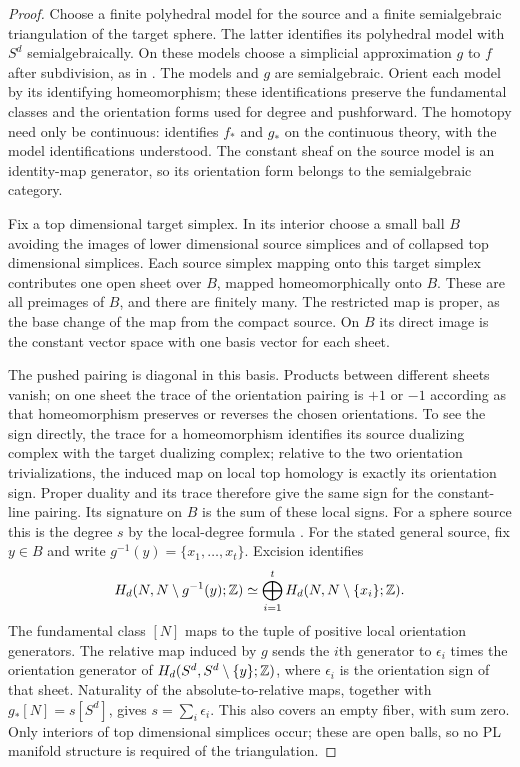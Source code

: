 \begin{proof}
Choose a finite polyhedral model for the source and a finite
semialgebraic triangulation of the target sphere.  The latter
identifies its polyhedral model with $S^d$ semialgebraically.
On these models choose a simplicial approximation $g$ to $f$
after subdivision, as in
\cite[Theorem~2C.1, pp.~177--179]{Hatcher2002}.
The models and $g$ are semialgebraic.  Orient each model by its
identifying homeomorphism; these identifications preserve the
fundamental classes and the orientation forms used for degree and
pushforward.  The homotopy need only be continuous:
 identifies $f_*$ and $g_*$ on the continuous
theory, with the model identifications understood.  The constant
sheaf on the source model is an identity-map generator, so its
orientation form belongs to the semialgebraic category.

Fix a top dimensional target simplex.  In its interior choose
a small ball $B$ avoiding the images of lower dimensional source
simplices and of collapsed top dimensional simplices.  Each
source simplex mapping onto this target simplex contributes
one open sheet over $B$, mapped homeomorphically onto $B$.
These are all preimages of $B$, and there are finitely many.
The restricted map is proper, as the base change of the map
from the compact source.  On $B$ its direct image is the
constant vector space with one basis vector for each sheet.

The pushed pairing is diagonal in this basis.  Products between
different sheets vanish; on one sheet the trace of the
orientation pairing is $+1$ or $-1$ according as that
homeomorphism preserves or reverses the chosen orientations.
To see the sign directly, the trace for a homeomorphism
identifies its source dualizing complex with the target
dualizing complex; relative to the two orientation
trivializations, the induced map on local top homology is
exactly its orientation sign.  Proper duality and its trace
therefore give the same sign for the constant-line pairing.
Its signature on $B$ is the sum of these local signs.  For a sphere
source this is the degree $s$ by the local-degree formula
\cite[Proposition~2.30, pp.~135--136]{Hatcher2002}.
For the stated general source, fix $y\in B$ and write
$g^{-1}(y)=\{x_1,\ldots,x_t\}$.  Excision identifies
\[
 H_d(N,N\setminus g^{-1}(y);\mathbb Z)
 \simeq\bigoplus_{i=1}^t H_d(N,N\setminus\{x_i\};\mathbb Z).
\]
The fundamental class $[N]$ maps to the tuple of positive local
orientation generators.  The relative map induced by $g$ sends the
$i$th generator to $\epsilon_i$ times the orientation generator of
$H_d(S^d,S^d\setminus\{y\};\mathbb Z)$, where $\epsilon_i$ is the
orientation sign of that sheet.  Naturality of the absolute-to-relative
maps, together with $g_*[N]=s[S^d]$, gives
$s=\sum_i\epsilon_i$.  This also covers an empty fiber, with sum zero.
Only interiors of top dimensional simplices occur; these are open
balls, so no PL manifold structure is required of the triangulation.


\end{proof}
